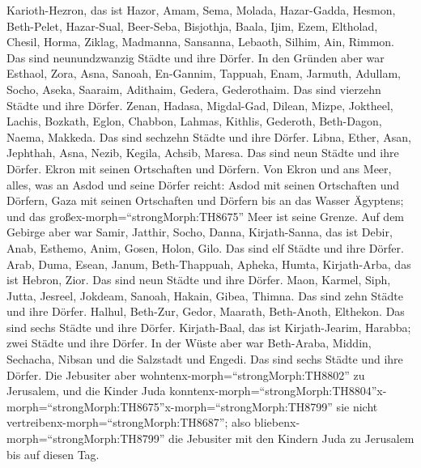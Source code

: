 Karioth-Hezron, das ist Hazor,  Amam, Sema, Molada,
 Hazar-Gadda, Hesmon, Beth-Pelet,  Hazar-Sual,
Beer-Seba, Bisjothja,  Baala, Ijim, Ezem, 
Eltholad, Chesil, Horma,  Ziklag, Madmanna, Sansanna,
 Lebaoth, Silhim, Ain, Rimmon. Das sind neunundzwanzig
Städte und ihre Dörfer.  In den Gründen aber war Esthaol,
Zora, Asna,  Sanoah, En-Gannim, Tappuah, Enam,
 Jarmuth, Adullam, Socho, Aseka,  Saaraim,
Adithaim, Gedera, Gederothaim. Das sind vierzehn Städte und ihre Dörfer.
 Zenan, Hadasa, Migdal-Gad,  Dilean, Mizpe,
Joktheel,  Lachis, Bozkath, Eglon,  Chabbon,
Lahmas, Kithlis,  Gederoth, Beth-Dagon, Naema, Makkeda. Das
sind sechzehn Städte und ihre Dörfer.  Libna, Ether, Asan,
 Jephthah, Asna, Nezib,  Kegila, Achsib,
Maresa. Das sind neun Städte und ihre Dörfer.  Ekron mit
seinen Ortschaften und Dörfern.  Von Ekron und ans Meer,
alles, was an Asdod und seine Dörfer reicht:  Asdod mit
seinen Ortschaften und Dörfern, Gaza mit seinen Ortschaften und Dörfern
bis an das Wasser Ägyptens; und das großex-morph=``strongMorph:TH8675''
Meer ist seine Grenze.  Auf dem Gebirge aber war Samir,
Jatthir, Socho,  Danna, Kirjath-Sanna, das ist Debir,
 Anab, Esthemo, Anim,  Gosen, Holon, Gilo. Das
sind elf Städte und ihre Dörfer.  Arab, Duma, Esean,
 Janum, Beth-Thappuah, Apheka,  Humta,
Kirjath-Arba, das ist Hebron, Zior. Das sind neun Städte und ihre
Dörfer.  Maon, Karmel, Siph, Jutta,  Jesreel,
Jokdeam, Sanoah,  Hakain, Gibea, Thimna. Das sind zehn
Städte und ihre Dörfer.  Halhul, Beth-Zur, Gedor,
 Maarath, Beth-Anoth, Elthekon. Das sind sechs Städte und
ihre Dörfer.  Kirjath-Baal, das ist Kirjath-Jearim,
Harabba; zwei Städte und ihre Dörfer.  In der Wüste aber
war Beth-Araba, Middin, Sechacha,  Nibsan und die Salzstadt
und Engedi. Das sind sechs Städte und ihre Dörfer.  Die
Jebusiter aber wohntenx-morph=``strongMorph:TH8802'' zu Jerusalem, und
die Kinder Juda
konntenx-morph=``strongMorph:TH8804''\textbar x-morph=``strongMorph:TH8675''x-morph=``strongMorph:TH8799''
sie nicht vertreibenx-morph=``strongMorph:TH8687''; also
bliebenx-morph=``strongMorph:TH8799'' die Jebusiter mit den Kindern Juda
zu Jerusalem bis auf diesen Tag.

